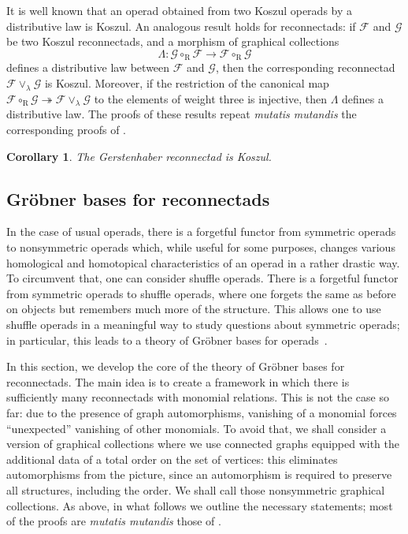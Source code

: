 \documentclass[11pt]{article}
\newtheorem{coro}[theo]{Corollary}
\theoremstyle{definition}
\numberwithin{equation}{section}
\newcommand\calF{\mathcal{F}}
\newcommand\calG{\mathcal{G}}
\DeclareMathOperator{\rmR}{\mathrm{R}}
\begin{document}
It is well known that an operad obtained from two Koszul operads by a distributive law is Koszul. An analogous result holds for reconnectads: if $\calF$ and $\calG$ be two Koszul reconnectads, and a morphism of graphical collections
\[
    \Lambda\colon \calG \circ_{\rmR} \calF \rightarrow \calF \circ_{\rmR} \calG
\]
defines a distributive law between $\calF$ and $\calG$, then the corresponding reconnectad $\calF\vee_{\lambda}\calG$ is Koszul. Moreover, if the restriction of the canonical map $\calF\circ_{\rmR}\calG\twoheadrightarrow \calF\vee_{\lambda}\calG$ to the elements of weight three is injective, then $\Lambda$ defines a distributive law. The proofs of these results repeat \emph{mutatis mutandis} the corresponding proofs of \cite[Sec.~8.6]{MR2954392}.

\begin{coro}
The Gerstenhaber reconnectad is Koszul.
\end{coro}

\subsection{Gr\"obner bases for reconnectads}\label{sec:shuffle}

In the case of usual operads, there is a forgetful functor from symmetric operads to nonsymmetric operads which, while useful for some purposes, changes various homological and homotopical characteristics of an operad in a rather drastic way. To circumvent that, one can consider shuffle operads. There is a forgetful functor from symmetric operads to shuffle operads, where one forgets the same as before on objects but remembers much more of the structure. This allows one to use shuffle operads in a meaningful way to study questions about symmetric operads; in particular, this leads to a theory of Gr\"obner bases for operads~\cite{MR2667136}. 

In this section, we develop the core of the theory of Gr\"obner bases for reconnectads. The main idea is to create a framework in which there is sufficiently many reconnectads with monomial relations. This is not the case so far: due to the presence of graph automorphisms, vanishing of a monomial forces ``unexpected'' vanishing of other monomials. To avoid that, we shall consider a version of graphical collections where we use connected graphs equipped with the additional data of a total order on the set of vertices: this eliminates automorphisms from the picture, since an automorphism is required to preserve all structures, including the order.  
We shall call those nonsymmetric graphical collections. As above, in what follows we outline the necessary statements; most of the proofs are \emph{mutatis mutandis} those of \cite[Sec.~8.2]{MR2954392}.
\end{document}
